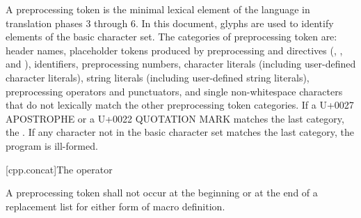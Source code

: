 \documentclass{wg21}
\begin{document}
\pnum
A preprocessing token is the minimal lexical element of the language in translation
phases 3 through 6.
In this document,
glyphs are used to identify
elements of the basic character set.
The categories of preprocessing token are: header names,
placeholder tokens produced by preprocessing  and  directives
(, , and ),
identifiers, preprocessing numbers, character literals (including user-defined character
literals), string literals (including user-defined string literals), preprocessing
operators and punctuators, and single non-whitespace characters that do not lexically
match the other preprocessing token categories.
If a U+0027 APOSTROPHE or a U+0022 QUOTATION MARK
matches the last category, the .
If any character not in the basic character set matches the last category,
the program is ill-formed.

[cpp.concat]{The \tcode{\#\#} operator}%
%

\pnum
A
\tcode{\#\#}
preprocessing token shall not occur at the beginning or
at the end of a replacement list for either form
of macro definition.
\end{document}
